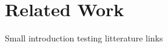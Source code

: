 \section{Related Work}
\label{sec:RelatedWork}

Small introduction
testing litterature links
\cite{ISO8601:2006}
